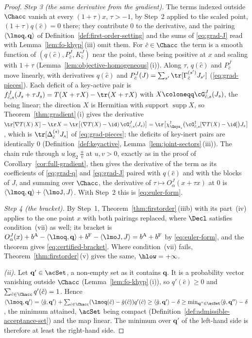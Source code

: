 \begin{proof}
\emph{Step 3 (the same derivative from the gradient).} The terms indexed
outside $\Chacc$ vanish at every $(1+\tau)x$, $\tau>-1$, by Step~2 applied to
the scaled point, $(1+\tau)q(\hat c)=0$ there; they contribute $0$ to the
derivative, and the pairing $\langle\lmoq,\mathbf q\rangle$ of
Definition~\ref{def:first-order-setting} and the sums of \eqref{eq:grad-J}
read with Lemma~\ref{lem:fo-khyp}\,(iii) omit them. For $\hat c\in\Chacc$
the term is a smooth function of $(q(\hat c),P^{J}_{\hat c},K^{J}_{\hat c})$
near the point, these being positive at $x$ and scaling with $1+\tau$
(Lemma~\ref{lem:objective-homogeneous}\,(i)). Along $\tau$,
$q(\hat c)$ and $P^{J}_{\hat c}$ move linearly, with derivatives $q(\hat c)$
and $P^{J}_{\hat c}(J)=\sum_{s'}\tr[\Gamma^{(s')}_{\hat c}J_{s'}]$
(\eqref{eq:grad-pieces}). Each deficit of a key-active pair is
$f^{J}_{\hat c,s}(J_s+\tau J_s)=T(X+\tau X)-\tr(X+\tau X)$ with
$X\coloneqq\cG^{J}_{\hat c,s}(J_s)$, the  being linear; the
direction $X$ is Hermitian with support $\operatorname{supp}X$, so
Theorem~\ref{thm:gradient}\,(i) gives the derivative
$\tr[\nabla T(X)\,X]-\tr X=\tr\big[(\nabla T(X)-\id)\,\cG^{J}_{\hat c,s}(J_s)\big]
=\tr\big[\chi^{\dagger}_{\Qsys_s}\big(\cG^{\dagger}_{\hat c,s}[\nabla T(X)-\id]\big)
J_s\big]$, which is $\tr[\Delta^{(s)}_{\hat c}J_s]$ of \eqref{eq:grad-pieces};
the deficits of key-inert pairs are identically $0$
(Definition~\ref{def:keyactive}, Lemma~\ref{lem:joint-sectors}\,(iii)).
The chain rule through $u\log_2\frac uv$ at $u,v>0$, exactly as in the proof
of Corollary~\ref{cor:full-gradient}, then gives the derivative of the term as
its coefficients of \eqref{eq:grad-q} and \eqref{eq:grad-J} paired with
$q(\hat c)$ and with the blocks of $J$, and summing over $\Chacc$, the
derivative of $\tau\mapsto O^{J}_{\alpha}(x+\tau x)$ at $0$ is
$\langle\lmoq,\mathbf q\rangle+\langle\lmoJ,J\rangle$. With Step~2 this is
\eqref{eq:euler-form}.

\emph{Step 4 (the bracket).} By Step~1, Theorem~\ref{thm:firstorder}\,(iiib)
with its part~(iv) applies to the one point $x$ with both pairings replaced,
where $\Decl$ satisfies condition~(vii) as well; its bracket is
$O^{J}_{\alpha}(x)+b^{\mathrm A}-\langle\lmoq,\mathbf q\rangle
+b^{\mathrm F}-\langle\lmoJ,J\rangle=b^{\mathrm A}+b^{\mathrm F}$ by
\eqref{eq:euler-form}, and the theorem gives \eqref{eq:certified-bracket}.
Where condition~(vii) fails, Theorem~\ref{thm:firstorder}\,(v) gives the same,
$\hlow=+\infty$.

\emph{(ii).} Let $\mathbf q'\in\acSet$, a non-empty set as it contains
$\mathbf q$. It is a probability vector vanishing outside $\Chacc$
(Lemma~\ref{lem:fo-khyp}\,(i)), so $q'(\hat c)\ge0$ and
$\sum_{\hat c\in\Chacc}q'(\hat c)=1$. Hence
$\langle\lmoq,\mathbf q'\rangle=\langle\hat g,\mathbf q'\rangle
+\sum_{\hat c\in\Chacc}(\lmoq(\hat c)-\hat g(\hat c))q'(\hat c)
\ge\langle\hat g,\mathbf q'\rangle-\delta
\ge\min_{\mathbf q''\in\acSet}\langle\hat g,\mathbf q''\rangle-\delta$, the
minimum attained, $\acSet$ being compact
(Definition~\ref{def:admissible-acceptance-set}) and the map linear. The
minimum over $\mathbf q'$ of the left-hand side is therefore at least the
right-hand side.


\end{proof}
